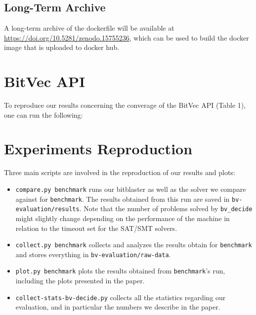 \documentclass[acmlarge, nonacm]{acmart}
\begin{document}
\subsection{Long-Term Archive}

A long-term archive of the dockerfile will be available at \url{https://doi.org/10.5281/zenodo.15755236},
which can be used to build the docker image that is uploaded to docker hub.


\section{BitVec API}
To reproduce our results concerning the converage of the BitVec API (Table 1), one can run the following: 

\section{Experiments Reproduction}

Three main scripts are involved in the reproduction of our results and plots:
\begin{itemize}
  \item \texttt{compare.py benchmark} runs our bitblaster as well as the solver we compare against for \texttt{benchmark}. The results obtained from this run are saved in \texttt{bv-evaluation/results}. Note that the number of problems solved by \texttt{bv\_decide} might slightly change depending on the performance of the machine in relation to the timeout set for the SAT/SMT solvers.
  \item \texttt{collect.py benchmark} collects and analyzes the results obtain for \texttt{benchmark} and stores everything in \texttt{bv-evaluation/raw-data}. 
  \item \texttt{plot.py benchmark} plots the results obtained from \texttt{benchmark}'s run, including the plots presented in the paper. 
  \item \texttt{collect-stats-bv-decide.py} collects all the statistics regarding our evaluation, and in particular the numbers we describe in the paper.
\end{itemize}
\end{document}
